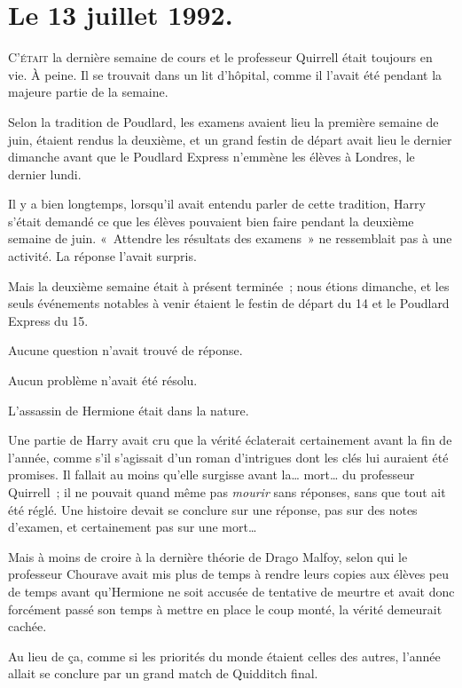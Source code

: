 
\section{Le 13 juillet 1992.}

\lettrine{C}{'était} la dernière semaine de cours et le professeur Quirrell était toujours en vie.
À peine.
Il se trouvait dans un lit d'hôpital, comme il l'avait été pendant la majeure partie de la semaine.

Selon la tradition de Poudlard, les examens avaient lieu la première semaine de juin, étaient rendus la deuxième, et un grand festin de départ avait lieu le dernier dimanche avant que le Poudlard Express n'emmène les élèves à Londres, le dernier lundi.

Il y a bien longtemps, lorsqu'il avait entendu parler de cette tradition, Harry s'était demandé ce que les élèves pouvaient bien faire pendant la deuxième semaine de juin.
«~Attendre les résultats des examens~» ne ressemblait pas à une activité.
La réponse l'avait surpris.

Mais la deuxième semaine était à présent terminée~; nous étions dimanche, et les seuls événements notables à venir étaient le festin de départ du 14 et le Poudlard Express du 15.

Aucune question n'avait trouvé de réponse.

Aucun problème n'avait été résolu.

L'assassin de Hermione était dans la nature.

Une partie de Harry avait cru que la vérité éclaterait certainement avant la fin de l'année, comme s'il s'agissait d'un roman d'intrigues dont les clés lui auraient été promises.
Il fallait au moins qu'elle surgisse avant la… mort… du professeur Quirrell~; il ne pouvait quand même pas \emph{mourir} sans réponses, sans que tout ait été réglé.
Une histoire devait se conclure sur une réponse, pas sur des notes d'examen, et certainement pas sur une mort…

Mais à moins de croire à la dernière théorie de Drago Malfoy, selon qui le professeur Chourave avait mis plus de temps à rendre leurs copies aux élèves peu de temps avant qu'Hermione ne soit accusée de tentative de meurtre et avait donc forcément passé son temps à mettre en place le coup monté, la vérité demeurait cachée.

Au lieu de ça, comme si les priorités du monde étaient celles des autres, l'année allait se conclure par un grand match de Quidditch final.

